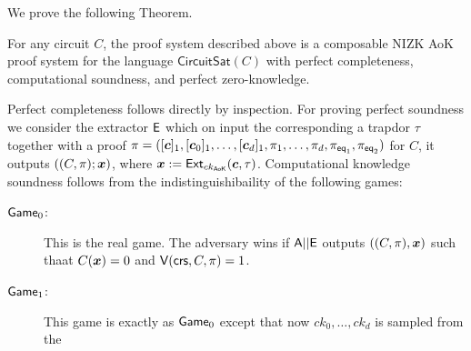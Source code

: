 We prove the following Theorem.

\begin{theorem} \label{theo:bits}
For any circuit $C$, the proof system described above is a composable NIZK AoK proof system for the language \(\mathsf{CircuitSat}(C)\)
 with perfect completeness, computational soundness, and perfect zero-knowledge.
\end{theorem}	
Perfect completeness follows directly by inspection.
For proving perfect soundness we consider the extractor $\mathsf{E}$ which on input the corresponding a trapdor $\tau$ together with a proof $\pi=([{\boldsymbol{c}}]_1,[{\boldsymbol{c}}_0]_1,\ldots,[{\boldsymbol{c}}_d]_1,\pi_1,\ldots,\pi_d,\pi_{\mathsf{eq}_1},\pi_{\mathsf{eq}_2})$ for $C$, it outputs $((C,\pi); {\boldsymbol{x}})$, where ${\boldsymbol{x}}:=\mathsf{Ext}_{ck_\mathsf{AoK}}({\boldsymbol{c}},\tau)$. Computational knowledge soundness follows from the indistinguishibaility of the following games:
\begin{description}
\item[$\mathsf{Game}_0$:] This is the real game. The adversary wins if $\mathsf{A}||\mathsf{E}$ outputs $((C,\pi),{\boldsymbol{x}})$ such thaat $C({\boldsymbol{x}})=0$ and $\mathsf{V}(\mathsf{crs},C,\pi)=1$.
\item[$\mathsf{Game}_1$:] This game is exactly as $\mathsf{Game}_0$ except that now $ck_0,\ldots,ck_d$ is sampled from the 
\end{description}

